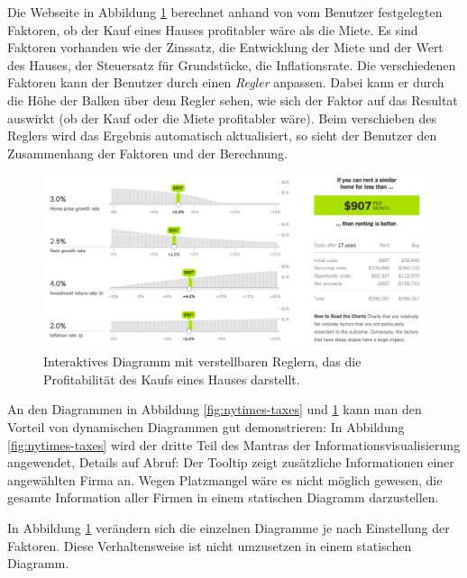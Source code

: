 Die Webseite in Abbildung \ref{fig:nytimes-realestate} berechnet anhand von vom Benutzer festgelegten Faktoren, ob der Kauf eines Hauses profitabler wäre als die Miete. Es sind Faktoren vorhanden wie der Zinssatz, die Entwicklung der Miete und der Wert des Hauses, der Steuersatz für Grundstücke, die Inflationsrate. Die verschiedenen Faktoren kann der Benutzer durch einen \textit{Regler} anpassen. Dabei kann er durch die Höhe der Balken über dem Regler sehen, wie sich der Faktor auf das Resultat auswirkt (ob der Kauf oder die Miete profitabler wäre). Beim verschieben des Reglers wird das Ergebnis automatisch aktualisiert, so sieht der Benutzer den Zusammenhang der Faktoren und der Berechnung.

\begin{figure}[H]
	\centering
	\includegraphics[width=\linewidth]{images/nytimes-realestate-zugeschnitten}
	\caption[Interaktives Diagramm in The New York Times ()]{Interaktives Diagramm mit verstellbaren Reglern, das die Profitabilität des Kaufs eines Hauses darstellt. \cite{nytimes-realestate}}
	\label{fig:nytimes-realestate}
\end{figure}


An den Diagrammen in Abbildung \ref{fig:nytimes-taxes} und \ref{fig:nytimes-realestate} kann man den Vorteil von dynamischen Diagrammen gut demonstrieren: In Abbildung \ref{fig:nytimes-taxes} wird der dritte Teil des Mantras der Informationsvisualisierung angewendet, Details auf Abruf: Der Tooltip zeigt zusätzliche Informationen einer angewählten Firma an. Wegen Platzmangel wäre es nicht möglich gewesen, die gesamte Information aller Firmen in einem statischen Diagramm darzustellen.

In Abbildung \ref{fig:nytimes-realestate} verändern sich die einzelnen Diagramme je nach Einstellung der Faktoren. Diese Verhaltensweise ist nicht umzusetzen in einem statischen Diagramm.

